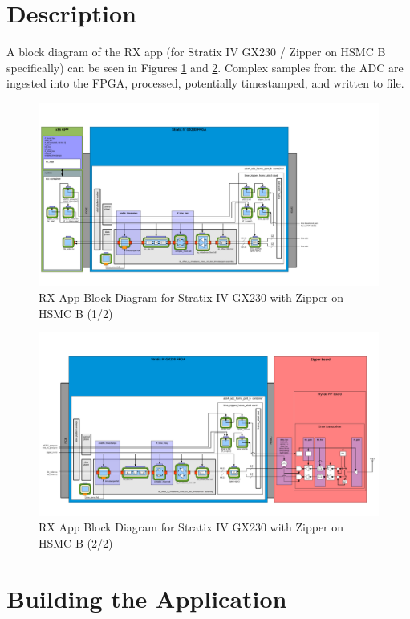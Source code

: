 \section{Description}
A block diagram of the RX app (for Stratix IV GX230 / Zipper on HSMC B specifically) can be seen in Figures \ref{fig:rx_app_left} and \ref{fig:rx_app_right}. Complex samples from the ADC are ingested into the FPGA, processed, potentially timestamped, and written to file.
\pagebreak
\begin{landscape}
	\begin{figure}[H]
	 	\centering
		\includegraphics[scale=.750, trim={0 0 6cm 0}]{rx_app_left}
		\caption{RX App Block Diagram for Stratix IV GX230 with Zipper on HSMC B (1/2)}
		\label{fig:rx_app_left}
	\end{figure}
	\begin{figure}[H]
	 	\centering
		\includegraphics[scale=.65, trim={0 0 1cm 0}]{rx_app_right}
		\caption{RX App Block Diagram for Stratix IV GX230 with Zipper on HSMC B (2/2)}
		\label{fig:rx_app_right}
	\end{figure}
\end{landscape}

\section{Building the Application}
